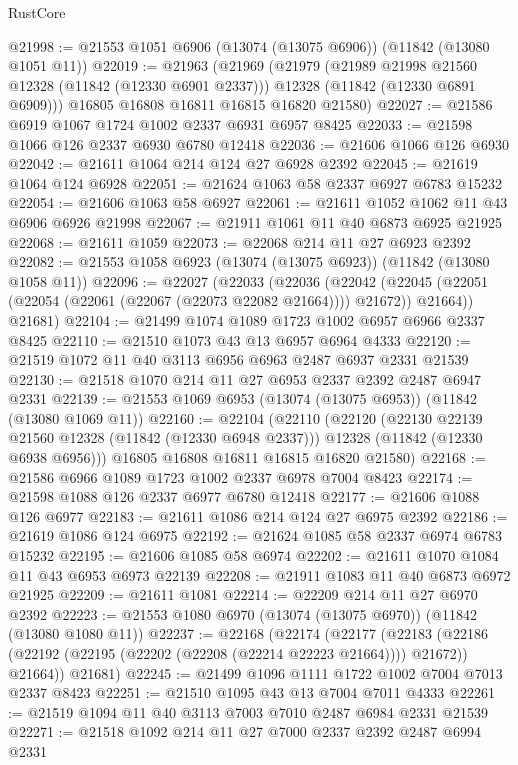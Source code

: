 \begin{lexlean}{RustCore}
\begin{coremodule}
@21998 := @21553 @1051 @6906 (@13074 (@13075 @6906)) (@11842 (@13080 @1051 @11))
@22019 := @21963
    (@21969
      (@21979
        (@21989 @21998 @21560 @12328 (@11842 (@12330 @6901 @2337)))
        @12328
        (@11842 (@12330 @6891 @6909)))
      @16805
      @16808
      @16811
      @16815
      @16820
      @21580)
@22027 := @21586 @6919 @1067 @1724 @1002 @2337 @6931 @6957 @8425
@22033 := @21598 @1066 @126 @2337 @6930 @6780 @12418
@22036 := @21606 @1066 @126 @6930
@22042 := @21611 @1064 @214 @124 @27 @6928 @2392
@22045 := @21619 @1064 @124 @6928
@22051 := @21624 @1063 @58 @2337 @6927 @6783 @15232
@22054 := @21606 @1063 @58 @6927
@22061 := @21611 @1052 @1062 @11 @43 @6906 @6926 @21998
@22067 := @21911 @1061 @11 @40 @6873 @6925 @21925
@22068 := @21611 @1059
@22073 := @22068 @214 @11 @27 @6923 @2392
@22082 := @21553 @1058 @6923 (@13074 (@13075 @6923)) (@11842 (@13080 @1058 @11))
@22096 := @22027
    (@22033
      (@22036
        (@22042 (@22045 (@22051 (@22054 (@22061 (@22067 (@22073 @22082 @21664)))) @21672)) @21664))
      @21681)
@22104 := @21499 @1074 @1089 @1723 @1002 @6957 @6966 @2337 @8425
@22110 := @21510 @1073 @43 @13 @6957 @6964 @4333
@22120 := @21519 @1072 @11 @40 @3113 @6956 @6963 @2487 @6937 @2331 @21539
@22130 := @21518 @1070 @214 @11 @27 @6953 @2337 @2392 @2487 @6947 @2331
@22139 := @21553 @1069 @6953 (@13074 (@13075 @6953)) (@11842 (@13080 @1069 @11))
@22160 := @22104
    (@22110
      (@22120
        (@22130 @22139 @21560 @12328 (@11842 (@12330 @6948 @2337)))
        @12328
        (@11842 (@12330 @6938 @6956)))
      @16805
      @16808
      @16811
      @16815
      @16820
      @21580)
@22168 := @21586 @6966 @1089 @1723 @1002 @2337 @6978 @7004 @8423
@22174 := @21598 @1088 @126 @2337 @6977 @6780 @12418
@22177 := @21606 @1088 @126 @6977
@22183 := @21611 @1086 @214 @124 @27 @6975 @2392
@22186 := @21619 @1086 @124 @6975
@22192 := @21624 @1085 @58 @2337 @6974 @6783 @15232
@22195 := @21606 @1085 @58 @6974
@22202 := @21611 @1070 @1084 @11 @43 @6953 @6973 @22139
@22208 := @21911 @1083 @11 @40 @6873 @6972 @21925
@22209 := @21611 @1081
@22214 := @22209 @214 @11 @27 @6970 @2392
@22223 := @21553 @1080 @6970 (@13074 (@13075 @6970)) (@11842 (@13080 @1080 @11))
@22237 := @22168
    (@22174
      (@22177
        (@22183 (@22186 (@22192 (@22195 (@22202 (@22208 (@22214 @22223 @21664)))) @21672)) @21664))
      @21681)
@22245 := @21499 @1096 @1111 @1722 @1002 @7004 @7013 @2337 @8423
@22251 := @21510 @1095 @43 @13 @7004 @7011 @4333
@22261 := @21519 @1094 @11 @40 @3113 @7003 @7010 @2487 @6984 @2331 @21539
@22271 := @21518 @1092 @214 @11 @27 @7000 @2337 @2392 @2487 @6994 @2331

\end{coremodule}
\end{lexlean}
